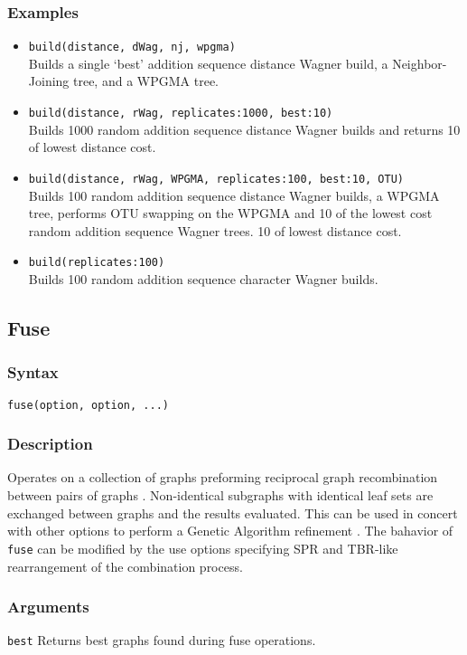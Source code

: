 \documentclass[11pt]{article}
\begin{document}
		\subsubsection{Examples}
			\begin{itemize}
				\item{\texttt{build(distance, dWag, nj, wpgma)}\\Builds a single `best' addition sequence distance Wagner build, a Neighbor-Joining tree, and a WPGMA tree.}
				\item{\texttt{build(distance, rWag, replicates:1000, best:10)}\\Builds 1000 random addition sequence distance Wagner builds and returns  
				10 of lowest distance cost.}
				\item{\texttt{build(distance, rWag, WPGMA, replicates:100, best:10, OTU)} \\Builds 100 random addition sequence  distance Wagner builds, a WPGMA tree, performs OTU swapping on the WPGMA and 10 of the lowest cost random addition sequence Wagner trees. 
				10 of lowest distance cost.}
				\item{\texttt{build(replicates:100)} \\Builds 100 random addition sequence  character Wagner builds.}
			\end{itemize}
	
	\subsection{Fuse}
		\subsubsection{Syntax}
		\texttt{fuse(option, option, ...)}
		
		\subsubsection{Description}
		Operates on a collection of graphs preforming reciprocal graph recombination between pairs of graphs \citep{moilanen1999, moilanen2001, goloboff1999}.  Non-identical subgraphs with identical leaf sets are
		exchanged between graphs and the results evaluated.  This can be  used in concert with other options  to perform a Genetic Algorithm refinement \citep{Holland1975}.  The bahavior of \texttt{fuse} can be modified by the use options specifying  SPR and TBR-like rearrangement of the combination process.
		\subsubsection{Arguments}
		\noindent \texttt{best} Returns best graphs found during fuse operations.		
		
\end{document}
